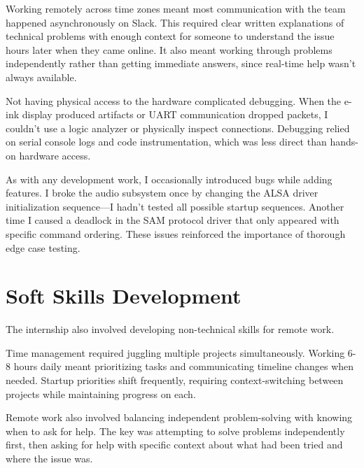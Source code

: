 \documentclass[12pt,a4paper]{report}
\begin{document}
Working remotely across time zones meant most communication with the team happened asynchronously on Slack. This required clear written explanations of technical problems with enough context for someone to understand the issue hours later when they came online. It also meant working through problems independently rather than getting immediate answers, since real-time help wasn't always available.

\vspace{0.3cm}

Not having physical access to the hardware complicated debugging. When the e-ink display produced artifacts or UART communication dropped packets, I couldn't use a logic analyzer or physically inspect connections. Debugging relied on serial console logs and code instrumentation, which was less direct than hands-on hardware access.

\vspace{0.3cm}

As with any development work, I occasionally introduced bugs while adding features. I broke the audio subsystem once by changing the ALSA driver initialization sequence—I hadn't tested all possible startup sequences. Another time I caused a deadlock in the SAM protocol driver that only appeared with specific command ordering. These issues reinforced the importance of thorough edge case testing.

\section{Soft Skills Development}

The internship also involved developing non-technical skills for remote work.

\vspace{0.3cm}

Time management required juggling multiple projects simultaneously. Working 6-8 hours daily meant prioritizing tasks and communicating timeline changes when needed. Startup priorities shift frequently, requiring context-switching between projects while maintaining progress on each.

\vspace{0.3cm}

Remote work also involved balancing independent problem-solving with knowing when to ask for help. The key was attempting to solve problems independently first, then asking for help with specific context about what had been tried and where the issue was.
\end{document}
